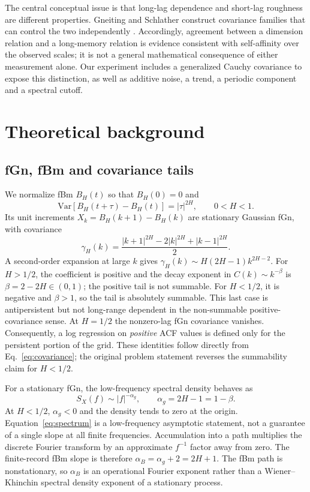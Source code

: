 \documentclass[12pt,twocolumn]{article}
\begin{document}
The central conceptual issue is that long-lag dependence and short-lag roughness are different properties. Gneiting and Schlather construct covariance families that can control the two independently \cite{gneiting2004}. Accordingly, agreement between a dimension relation and a long-memory relation is evidence consistent with self-affinity over the observed scales; it is not a general mathematical consequence of either measurement alone. Our experiment includes a generalized Cauchy covariance to expose this distinction, as well as additive noise, a trend, a periodic component and a spectral cutoff.

\section{Theoretical background}
\subsection{fGn, fBm and covariance tails}

We normalize fBm $B_H(t)$ so that $B_H(0)=0$ and
\begin{equation}
 \mathrm{Var}[B_H(t+\tau)-B_H(t)]=|\tau|^{2H},\qquad 0<H<1.
 \label{eq:increment}
\end{equation}
Its unit increments $X_k=B_H(k+1)-B_H(k)$ are stationary Gaussian fGn, with covariance
\begin{equation}
 \gamma_H(k)=\frac{|k+1|^{2H}-2|k|^{2H}+|k-1|^{2H}}{2}.
 \label{eq:covariance}
\end{equation}
A second-order expansion at large $k$ gives $\gamma_H(k)\sim H(2H-1)k^{2H-2}$. For $H>1/2$, the coefficient is positive and the decay exponent in $C(k)\sim k^{-\beta}$ is $\beta=2-2H\in(0,1)$; the positive tail is not summable. For $H<1/2$, it is negative and $\beta>1$, so the tail is absolutely summable. This last case is antipersistent but not long-range dependent in the non-summable positive-covariance sense. At $H=1/2$ the nonzero-lag fGn covariance vanishes. Consequently, a log regression on \emph{positive} ACF values is defined only for the persistent portion of the grid. These identities follow directly from Eq.~\eqref{eq:covariance}; the original problem statement reverses the summability claim for $H<1/2$.

For a stationary fGn, the low-frequency spectral density behaves as
\begin{equation}
 S_X(f)\sim |f|^{-\alpha_g},\qquad \alpha_g=2H-1=1-\beta.
 \label{eq:spectrum}
\end{equation}
At $H<1/2$, $\alpha_g<0$ and the density tends to zero at the origin. Equation~\eqref{eq:spectrum} is a low-frequency asymptotic statement, not a guarantee of a single slope at all finite frequencies. Accumulation into a path multiplies the discrete Fourier transform by an approximate $f^{-1}$ factor away from zero. The finite-record fBm slope is therefore $\alpha_B=\alpha_g+2=2H+1$. The fBm path is nonstationary, so $\alpha_B$ is an operational Fourier exponent rather than a Wiener--Khinchin spectral density exponent of a stationary process.
\end{document}
